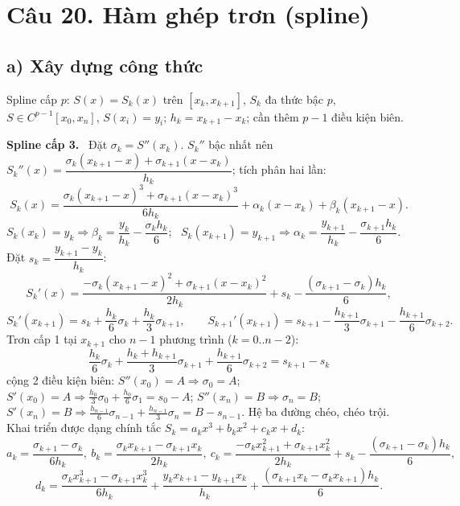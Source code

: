 \documentclass[11pt,a4paper]{article}
\newcommand{\pp}[1]{\par\smallskip\noindent\textbf{#1}\ }
\begin{document}
\section{Câu 20. Hàm ghép trơn (spline)}

\subsection{a) Xây dựng công thức}
Spline cấp $p$: $S(x)=S_k(x)$ trên $[x_k,x_{k+1}]$, $S_k$ đa thức bậc $p$, $S\in C^{p-1}[x_0,x_n]$, $S(x_i)=y_i$; $h_k=x_{k+1}-x_k$; cần thêm $p-1$ điều kiện biên.

\pp{Spline cấp 3.} Đặt $\sigma_k=S''(x_k)$. $S_k''$ bậc nhất nên $S_k''(x)=\dfrac{\sigma_k(x_{k+1}-x)+\sigma_{k+1}(x-x_k)}{h_k}$; tích phân hai lần:
\[ S_k(x)=\frac{\sigma_k(x_{k+1}-x)^3+\sigma_{k+1}(x-x_k)^3}{6h_k}+\alpha_k(x-x_k)+\beta_k(x_{k+1}-x). \]
$S_k(x_k)=y_k\Rightarrow\beta_k=\dfrac{y_k}{h_k}-\dfrac{\sigma_kh_k}{6}$; \ $S_k(x_{k+1})=y_{k+1}\Rightarrow\alpha_k=\dfrac{y_{k+1}}{h_k}-\dfrac{\sigma_{k+1}h_k}{6}$. Đặt $s_k=\dfrac{y_{k+1}-y_k}{h_k}$:
\[ S_k'(x)=\frac{-\sigma_k(x_{k+1}-x)^2+\sigma_{k+1}(x-x_k)^2}{2h_k}+s_k-\frac{(\sigma_{k+1}-\sigma_k)h_k}{6}, \]
\[ S_k'(x_{k+1})=s_k+\frac{h_k}{6}\sigma_k+\frac{h_k}{3}\sigma_{k+1},\qquad S_{k+1}'(x_{k+1})=s_{k+1}-\frac{h_{k+1}}{3}\sigma_{k+1}-\frac{h_{k+1}}{6}\sigma_{k+2}. \]
Trơn cấp 1 tại $x_{k+1}$ cho $n-1$ phương trình ($k=0..n-2$):
\[ \boxed{\frac{h_k}{6}\sigma_k+\frac{h_k+h_{k+1}}{3}\sigma_{k+1}+\frac{h_{k+1}}{6}\sigma_{k+2}=s_{k+1}-s_k} \]
cộng 2 điều kiện biên: $S''(x_0)=A\Rightarrow\sigma_0=A$; $S'(x_0)=A\Rightarrow\frac{h_0}{3}\sigma_0+\frac{h_0}{6}\sigma_1=s_0-A$; $S''(x_n)=B\Rightarrow\sigma_n=B$; $S'(x_n)=B\Rightarrow\frac{h_{n-1}}{6}\sigma_{n-1}+\frac{h_{n-1}}{3}\sigma_n=B-s_{n-1}$. Hệ ba đường chéo, chéo trội. Khai triển được dạng chính tắc $S_k=a_kx^3+b_kx^2+c_kx+d_k$:
\[ a_k=\frac{\sigma_{k+1}-\sigma_k}{6h_k},\ b_k=\frac{\sigma_kx_{k+1}-\sigma_{k+1}x_k}{2h_k},\ c_k=\frac{-\sigma_kx_{k+1}^2+\sigma_{k+1}x_k^2}{2h_k}+s_k-\frac{(\sigma_{k+1}-\sigma_k)h_k}{6}, \]
\[ d_k=\frac{\sigma_kx_{k+1}^3-\sigma_{k+1}x_k^3}{6h_k}+\frac{y_kx_{k+1}-y_{k+1}x_k}{h_k}+\frac{(\sigma_{k+1}x_k-\sigma_kx_{k+1})h_k}{6}. \]
\end{document}
